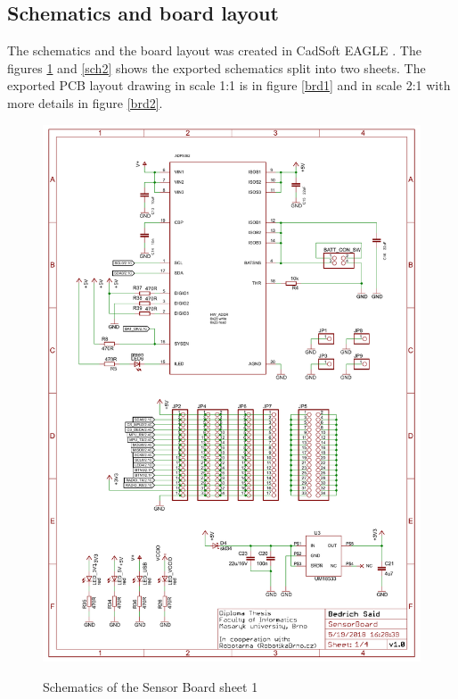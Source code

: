 \subsection{Schematics and board layout}
The schematics and the board layout was created in CadSoft EAGLE \cite{EAGLE}. The figures \ref{sch1} and \ref{sch2} shows the exported schematics split into two sheets. The exported PCB layout drawing in scale 1:1 is in figure \ref{brd1} and in scale 2:1 with more details in figure \ref{brd2}.

\begin{figure}[H]
	\centering
	\includegraphics[angle=90, scale=1]{img/sch1.pdf}
	\label{sch1}
	\caption{Schematics of the Sensor Board sheet 1}
\end{figure}

